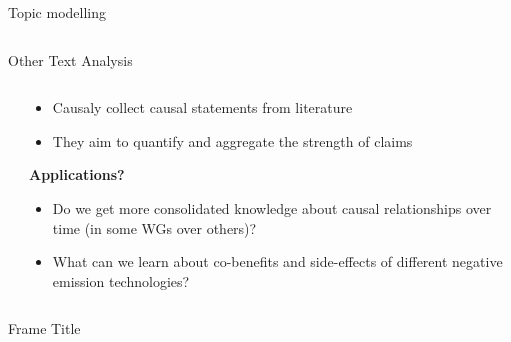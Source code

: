 \documentclass[9pt]{beamer}
\begin{document}
\begin{frame}{Topic modelling}
\begin{columns}
\begin{column}{0.6\linewidth}
\begin{center}
\begin{itemize}
			\end{itemize}
		\end{center}
	\end{column}
\end{columns}

\end{frame}




\begin{frame}{Other Text Analysis}

\begin{columns}
	\begin{column}{0.5\linewidth}
		\begin{center}
		\end{center}
	\end{column}
	\begin{column}{0.5\linewidth}
		\begin{center}
			\begin{itemize}
				\item Causaly collect causal statements from literature
				\item They aim to quantify and aggregate the strength of claims
				
			\end{itemize}
		\medskip
		\textbf{Applications?}
		\begin{itemize}
			\item Do we get more consolidated knowledge about causal relationships over time (in some WGs over others)?
			\item What can we learn about co-benefits and side-effects of different negative emission technologies?
		
				
			\end{itemize}
		\end{center}
	\end{column}
\end{columns}

\end{frame}



\begin{frame}{Frame Title}
	\small
	
\end{frame}
\end{document}
